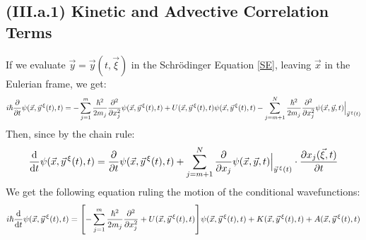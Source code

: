 \documentclass[11pt, a4paper]{article} %
\begin{document}
\subsection*{(III.a.1) Kinetic and Advective Correlation Terms}
If we evaluate $\vec{y}=\vec{y}(t,\vec{\xi})$ in the Schrödinger Equation \eqref{SE}, leaving $\vec{x}$ in the Eulerian frame, we get:
\begin{equation}
i\hbar \pdv{}{t}\psi(\vec{x}, \vec{y}^{\, \xi}(t),t)=-\sum_{j=1}^m \frac{\hbar^2}{2m_j}\pdv[2]{}{x_j} \psi(\vec{x}, \vec{y}^{\, \xi}(t),t) + U(\vec{x}, \vec{y}^{\, \xi}(t),t)\psi(\vec{x}, \vec{y}^{\, \xi}(t),t) -\sum_{j=m+1}^N \frac{\hbar^2}{2m_j}\pdv[2]{}{x_j} \psi(\vec{x}, \vec{y},t)\Big\rvert_{\vec{y}^{\, \xi}(t)}
\end{equation}
Then, since by the chain rule:
\begin{equation}
\dv{}{t}\psi(\vec{x}, \vec{y}^{\, \xi}(t),t)=\pdv{}{t}\psi(\vec{x}, \vec{y}^{\, \xi}(t),t)+\sum_{j=m+1}^N \pdv{}{x_j}\psi(\vec{x}, \vec{y},t)\Big\rvert_{\vec{y}^{\, \xi}(t)}\cdot \pdv{x_j(\vec{\xi},t)}{t}
\end{equation}
We get the following equation ruling the motion of the conditional wavefunctions:
\begin{equation}\label{KinAdvEL}
i\hbar \dv{}{t}\psi(\vec{x}, \vec{y}^{\, \xi}(t),t)=\qty[-\sum_{j=1}^m \frac{\hbar^2}{2m_j}\pdv[2]{}{x_j} + U(\vec{x}, \vec{y}^{\, \xi}(t),t)]\psi(\vec{x}, \vec{y}^{\, \xi}(t),t)+K(\vec{x}, \vec{y}^{\, \xi}(t),t)+A(\vec{x}, \vec{y}^{\, \xi}(t),t)
\end{equation}
\end{document}
